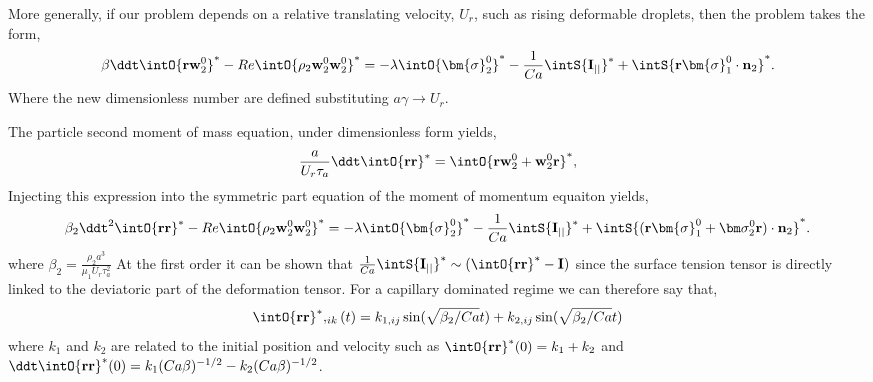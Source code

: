 More generally, if our problem depends on a relative translating velocity, $U_r$, such as rising deformable droplets, then the problem takes the form, 
\begin{equation}
    \beta
    \ddt \intO{\textbf{r} \textbf{w}^0_2}^*
    - Re \intO{\rho_2  \textbf{w}_2^0 \textbf{w}_2^0}^*
    = 
    - \lambda  \intO{\bm{\sigma}_2^0}^*
    - \frac{1}{Ca} \intS{ \textbf{I}_{||}}^*
    + \intS{ \textbf{r}\bm{\sigma}_1^0\cdot \textbf{n}_2}^*. 
\end{equation}
Where the new dimensionless number are defined substituting $a\gamma \rightarrow U_r$. 

The particle second moment of mass equation, under dimensionless form yields, 
\begin{equation*}
    \frac{a}{U_r \tau_a}\ddt 
    \intO{\textbf{rr}}^*
    = \intO{\textbf{rw}_2^0+\textbf{w}_2^0 \textbf{r}}^*,
\end{equation*}
Injecting this expression into the symmetric part equation of the moment of momentum equaiton yields,
\begin{equation}
    {\beta_2}
    \ddt^2  \intO{\textbf{r} \textbf{r}}^*
    - Re \intO{\rho_2  \textbf{w}_2^0 \textbf{w}_2^0}^*
    = 
    - \lambda  \intO{\bm{\sigma}_2^0}^*
    - \frac{1}{Ca} \intS{ \textbf{I}_{||}}^*
    + \intS{ (\textbf{r}\bm{\sigma}_1^0+\bm\sigma_2^0\textbf{r})\cdot \textbf{n}_2}^*. 
\end{equation}
where $\beta_2 = \frac{\rho_2 a^3}{\mu_1 U_r \tau_a^2}$
At the first order it can be shown that $\frac{1}{Ca} \intS{ \textbf{I}_{||}}^* \sim (\intO{\textbf{r} \textbf{r}}^* - \textbf{I})$ since the surface tension tensor is directly linked to the deviatoric part of the deformation tensor.  
For a capillary dominated regime we can therefore say that, 
\begin{equation*}
    \intO{\textbf{rr}}^*,_{ik}(t) 
    = k_{1,ij} \sin(\sqrt{\beta_2/Ca} t)
    + k_{2,ij} \sin(\sqrt{\beta_2/Ca} t)
\end{equation*}
where $k_1$ and $k_2$ are related to the initial position and velocity such as
$\intO{\textbf{rr}}^*(0) = k_1+k_2 $ and $\ddt\intO{\textbf{rr}}^*(0) = k_1(Ca \beta)^{-1/2}-k_2(Ca \beta)^{-1/2} $. 

